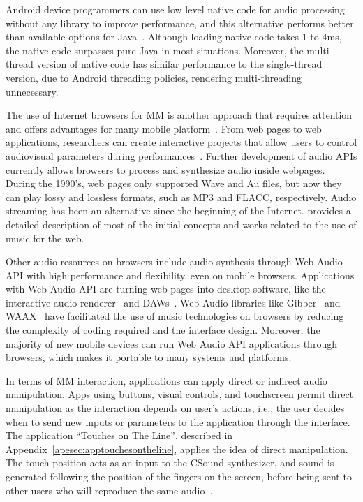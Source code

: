 Android device programmers can use low level native code for audio processing without any library to improve performance, and this alternative performs better than available options for Java~\citep{deCarvalhoJunior2013fftbenchmark,bianchi2014processamento}.
Although loading native code takes 1 to 4ms, the native code surpasses pure Java in most situations.
Moreover, the multi-thread version of native code has similar performance to the single-thread version, due to Android threading policies, rendering multi-threading unnecessary.

The use of Internet browsers for MM is another approach that requires attention and offers advantages for many mobile platform~\citep{Wyse2013viability}.
From web pages to web applications, researchers  can create interactive projects that allow users to control audiovisual parameters during performances~\citep{Allison2013nexus,Weitzner2012massmobile}.
Further development of audio APIs currently allows browsers to process and synthesize audio inside webpages.
During the 1990's, web pages only supported Wave and Au files, but now they can play lossy and lossless formats, such as MP3 and FLACC, respectively.
Audio streaming has been an alternative since the beginning of the Internet.
\cite{Duckworth2005virtual} provides a detailed description of most of the initial concepts and works related to the use of music for the web.

Other audio resources on browsers include audio synthesis through Web Audio API with high performance and flexibility, even on mobile browsers.
Applications with Web Audio API are turning web pages into desktop software, like the interactive audio renderer~\citep{Matuszewski2016interactive} and DAWs~\citep{Kleimola2015daw}.
Web Audio libraries like Gibber~\citep{Roberts2012gibberlivecoding} and WAAX~\citep{Choi2013waax} have facilitated the use of music technologies on browsers by reducing the complexity of coding required and the interface design.
Moreover, the majority of new mobile devices can run Web Audio API applications through browsers, which makes it portable to many systems and platforms.

In terms of MM interaction, applications can apply direct or indirect audio manipulation.
Apps using buttons, visual controls, and touchscreen permit direct manipulation as the interaction depends on user's actions, i.e., the user decides when to send new inputs or parameters to the application through the interface.
The application ``Touches on The Line'', described in Appendix~\ref{apesec:apptouchesontheline}, applies the idea of direct manipulation.
The touch position acts as an input to the CSound synthesizer, and sound is generated following the position of the fingers on the screen, before being sent to other users who will reproduce the same audio~\citep{deCarvalhoJunior2013touches}.

